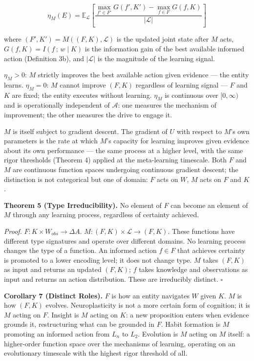 \documentclass[
]{article}
\begin{document}
\[\eta_M(E) = \mathbb{E}_{\mathcal{L}} \left[ \frac{\max_{f' \in F'} G(f', K') - \max_{f \in F} G(f, K)}{|\mathcal{L}|} \right]\]

where \((F', K') = M((F, K), \mathcal{L})\) is the updated joint state
after \(M\) acts, \(G(f, K) = I(f\,;\, w \mid K)\) is the information
gain of the best available informed action (Definition 3b), and
\(|\mathcal{L}|\) is the magnitude of the learning signal.

\(\eta_M > 0\): \(M\) strictly improves the best available action given
evidence --- the entity learns. \(\eta_M = 0\): \(M\) cannot improve
\((F, K)\) regardless of learning signal --- \(F\) and \(K\) are fixed;
the entity executes without learning. \(\eta_M\) is continuous over
\([0, \infty)\) and is operationally independent of \(\mathcal{A}\): one
measures the mechanism of improvement; the other measures the drive to
engage it.

\(M\) is itself subject to gradient descent. The gradient of \(U\) with
respect to \(M\)'s own parameters is the rate at which \(M\)'s capacity
for learning improves given evidence about its own performance --- the
same process at a higher level, with the same rigor thresholds (Theorem
4) applied at the meta-learning timescale. Both \(F\) and \(M\) are
continuous function spaces undergoing continuous gradient descent; the
distinction is not categorical but one of domain: \(F\) acts on \(W\),
\(M\) acts on \(F\) and \(K\).

\textbf{Theorem 5 (Type Irreducibility).} No element of \(F\) can become
an element of \(M\) through any learning process, regardless of
certainty achieved.

\emph{Proof.} \(F : K \times W_{obs} \rightarrow \Delta A\).
\(M : (F, K) \times \mathcal{L} \rightarrow (F, K)\). These functions
have different type signatures and operate over different domains. No
learning process changes the type of a function. An informed action
\(f \in F\) that achieves certainty is promoted to a lower encoding
level; it does not change type. \(M\) takes \((F, K)\) as input and
returns an updated \((F, K)\); \(f\) takes knowledge and observations as
input and returns an action distribution. These are irreducibly
distinct. \(\square\)

\textbf{Corollary 7 (Distinct Roles).} \(F\) is how an entity navigates
\(W\) given \(K\). \(M\) is how \((F, K)\) evolves. Neuroplasticity is
not a more certain form of cognition; it is \(M\) acting on \(F\).
Insight is \(M\) acting on \(K\): a new proposition enters when evidence
grounds it, restructuring what can be grounded in \(F\). Habit formation
is \(M\) promoting an informed action from \(L_n\) to \(L_2\). Evolution
is \(M\) acting on \(M\) itself: a higher-order function space over the
mechanisms of learning, operating on an evolutionary timescale with the
highest rigor threshold of all.
\end{document}
